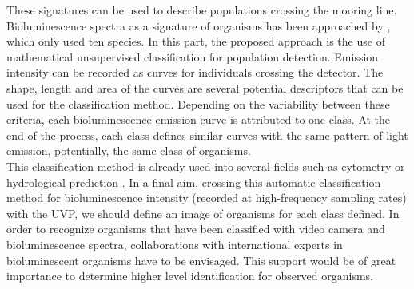 These signatures can be used to describe populations crossing the mooring line. Bioluminescence spectra as a signature of organisms has been approached by \cite{nealson1986}, which only used ten species. In this part, the proposed approach is the use of mathematical unsupervised classification for population detection. Emission intensity can be recorded as curves for individuals crossing the detector. The shape, length and area of the curves are several potential descriptors that can be used for the classification method. Depending on the variability between these criteria, each bioluminescence emission curve is attributed to one class. At the end of the process, each class defines similar curves with the same pattern of light emission, potentially, the same class of organisms.\\

This classification method is already used into several fields such as cytometry \citep{malkassian2011} or hydrological prediction \citep{nerini2000}. In a final aim, crossing this automatic classification method for bioluminescence intensity (recorded at high-frequency sampling rates) with the UVP, we should define an image of organisms for each class defined. In order to recognize organisms that have been classified with video camera and bioluminescence spectra, collaborations with international experts in bioluminescent organisms have to be envisaged. This support would be of great importance to determine higher level identification for observed organisms.\\ 


